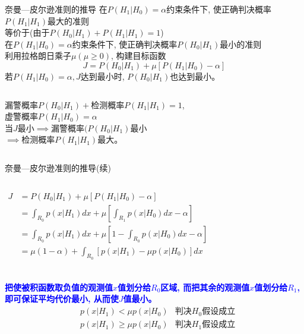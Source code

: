 \begin{frame}[shrink]{奈曼---皮尔逊准则的推导}
在$P(H_1|H_0)=\alpha$约束条件下, 使正确判决概率$P(H_1|H_1)$最大的准则\\
\qquad 等价于(由于$P(H_0|H_1)+P(H_1|H_1)=1$)\\
在$P(H_1|H_0)=\alpha$约束条件下, 使正确判决概率$P(H_0|H_1)$最小的准则\\
利用拉格朗日乘子$\mu(\mu\ge 0)$, 构建目标函数
\[ J=P(H_0|H_1)+\mu\left[P(H_1|H_0)-\alpha\right]\]
若$P(H_1|H_0)=\alpha, J$达到最小时, $P(H_0|H_1)$也达到最小。
\begin{columns}
\scriptsize
{}
漏警概率$P(H_0|H_1)+$检测概率$P(H_1|H_1)=1$,\\ 虚警概率$P(H_1|H_0)=\alpha$\\
当$J$最小$\implies$漏警概率$(P(H_0|H_1)$最小\\
$\implies$检测概率$P(H_1|H_1)$最大。
\leftline{\texttt{[image: R0R1]}}
\end{columns}
\end{frame}

\begin{frame}[shrink]{奈曼---皮尔逊准则的推导(续)}
\begin{columns}
\begin{align*}
J&=P(H_0|H_1)+\mu[P(H_1|H_0)-\alpha]\\
&=\int_{R_0}p(x|H_1)dx+\mu\left[\int_{R_1}p(x|H_0)dx-\alpha\right]\\
&=\int_{R_0}p(x|H_1)dx+\mu\left[1-\int_{R_0}p(x|H_0)dx-\alpha\right]\\
&=\mu(1-\alpha)+\int_{R_0}\left[p(x|H_1)-\mu p(x|H_0)\right]dx \\
\end{align*}
\leftline{\texttt{[image: R0R1]}}
\end{columns}
\textbf{\textcolor{blue}{把使被积函数取负值的观测值$x$值划分给$R_0$区域, 而把其余的观测值$x$值划分给$R_1$, 即可保证平均代价最小, 从而使$J$值最小。}}
\begin{align*}
&p(x|H_1)< \mu p(x|H_0)&\textbf{判决$H_0$假设成立}\\
&p(x|H_1)\ge \mu p(x|H_0)&\textbf{判决$H_1$假设成立}
\end{align*}
\end{frame}

